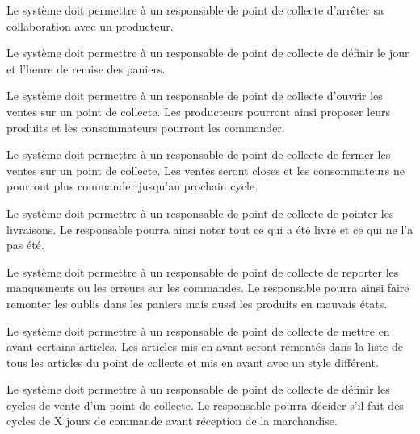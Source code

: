 \begin{reqs}{Le système doit permettre à un responsable de point de collecte d’arrêter sa collaboration avec un producteur.}
\end{reqs}

\begin{reqs}{Le système doit permettre à un responsable de point de collecte de définir le jour et l’heure de remise des paniers.}
\end{reqs}

\begin{reqs}{Le système doit permettre à un responsable de point de collecte d’ouvrir les ventes sur un point de collecte.}
Les producteurs pourront ainsi proposer leurs produits et les consommateurs pourront les commander.
\end{reqs}

\begin{reqs}{Le système doit permettre à un responsable de point de collecte de fermer les ventes sur un point de collecte.}
Les ventes seront closes et les consommateurs ne pourront plus commander jusqu’au prochain cycle.
\end{reqs}

\begin{reqs}{Le système doit permettre à un responsable de point de collecte de pointer les livraisons.}
Le responsable pourra ainsi noter tout ce qui a été livré et ce qui ne l’a pas été.
\end{reqs}

\begin{reqs}{Le système doit permettre à un responsable de point de collecte de reporter les manquements ou les erreurs sur les commandes.}
Le responsable pourra ainsi faire remonter les oublis dans les paniers mais aussi les produits en mauvais états.
\end{reqs}

\begin{reqs}{Le système doit permettre à un responsable de point de collecte de mettre en avant certains articles.}
Les articles mis en avant seront remontés dans la liste de tous les articles du point de collecte et mis en avant avec un style différent.
\end{reqs}

\begin{reqs}{Le système doit permettre à un responsable de point de collecte de définir les cycles de vente d’un point de collecte.}
Le responsable pourra décider s’il fait des cycles de X jours de commande avant réception de la marchandise.
\end{reqs}

